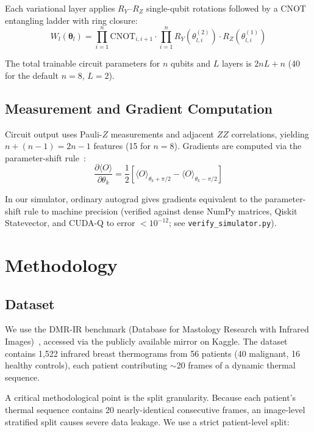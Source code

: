\documentclass[conference]{IEEEtran}
\begin{document}
Each variational layer applies $R_Y$--$R_Z$ single-qubit rotations followed by a CNOT entangling ladder with ring closure:
\begin{equation}
W_l(\boldsymbol{\theta}_l) = \prod_{i=1}^{n} \text{CNOT}_{i, i+1} \cdot \prod_{i=1}^{n} R_Y(\theta_{l,i}^{(2)}) \cdot R_Z(\theta_{l,i}^{(1)})
\end{equation}

The total trainable circuit parameters for $n$ qubits and $L$ layers is $2nL + n$ (40 for the default $n = 8$, $L = 2$).

\subsection{Measurement and Gradient Computation}
Circuit output uses Pauli-$Z$ measurements and adjacent $ZZ$ correlations, yielding $n + (n-1) = 2n-1$ features (15 for $n = 8$). Gradients are computed via the parameter-shift rule~\cite{mitarai2018quantum, schuld2019evaluating}:
\begin{equation}
\frac{\partial \langle O \rangle}{\partial \theta_k} = \frac{1}{2}\left[\langle O \rangle_{\theta_k + \pi/2} - \langle O \rangle_{\theta_k - \pi/2}\right]
\label{eq:param_shift}
\end{equation}

In our simulator, ordinary autograd gives gradients equivalent to the parameter-shift rule to machine precision (verified against dense NumPy matrices, Qiskit Statevector, and CUDA-Q to error $< 10^{-12}$; see \texttt{verify\_simulator.py}).

\section{Methodology}

\subsection{Dataset}
We use the DMR-IR benchmark (Database for Mastology Research with Infrared Images)~\cite{silva2014new}, accessed via the publicly available mirror on Kaggle. The dataset contains 1,522 infrared breast thermograms from 56 patients (40 malignant, 16 healthy controls), each patient contributing $\sim$20 frames of a dynamic thermal sequence.

A critical methodological point is the split granularity. Because each patient's thermal sequence contains 20 nearly-identical consecutive frames, an image-level stratified split causes severe data leakage. We use a strict patient-level split:
\end{document}
